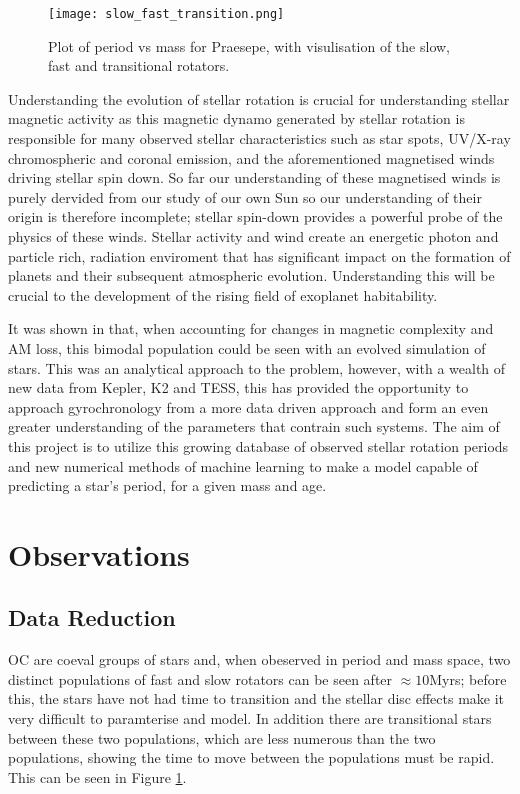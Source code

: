 \documentclass[fleqn,usenatbib]{mnras}
\begin{document}
\begin{figure}
	\texttt{[image: slow\_fast\_transition.png]}
	\caption[]{Plot of period vs mass for Praesepe, with visulisation of the slow, fast and transitional rotators.}
	\label{fig:slow_fast_transition}
\end{figure}

Understanding the evolution of stellar rotation is crucial for understanding stellar magnetic activity as this magnetic dynamo generated by stellar rotation is responsible for many observed stellar characteristics such as star spots, UV/X-ray chromospheric and coronal emission, and the aforementioned magnetised winds driving stellar spin down.
So far our understanding of these magnetised winds is purely dervided from our study of our own Sun so our understanding of their origin is therefore incomplete; stellar spin-down provides a powerful probe of the physics of these winds.
Stellar activity and wind create an energetic photon and particle rich, radiation enviroment that has significant impact on the formation of planets and their subsequent atmospheric evolution.
Understanding this will be crucial to the development of the rising field of exoplanet habitability.

It was shown in \cite{Garraffo_2018} that, when accounting for changes in magnetic complexity and AM loss, this bimodal population could be seen with an evolved simulation of stars.
This was an analytical approach to the problem, however, with a wealth of new data from Kepler, K2 and TESS, this has provided the opportunity to approach gyrochronology from a more data driven approach and form an even greater understanding of the parameters that contrain such systems.
The aim of this project is to utilize this growing database of observed stellar rotation periods and new numerical methods of machine learning to make a model capable of predicting a star's period, for a given mass and age.

\section{Observations}
\subsection{Data Reduction}
OC are coeval groups of stars and, when obeserved in period and mass space, two distinct populations of fast and slow rotators can be seen after $\approx 10$Myrs; before this, the stars have not had time to transition and the  stellar disc effects make it very difficult to paramterise and model.
In addition there are  transitional stars between these two populations, which are less numerous than the two populations, showing the time to move between the populations must be rapid.
This can be seen in Figure \ref{fig:slow_fast_transition}.
\end{document}
